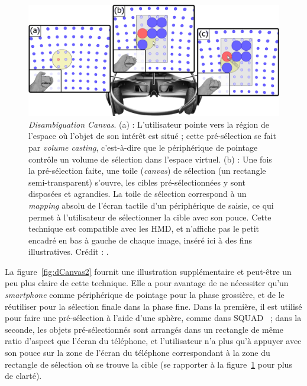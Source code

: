 	\begin{figure}[H]
		\centering
		\includegraphics[width=\textwidth]{figures/ch2/dCanvas}
		\caption[\emph{Disambiguation Canvas}]{\emph{Disambiguation Canvas}. (a) : L'utilisateur pointe vers la région de l'espace où l'objet de son intérêt est situé ; cette pré-sélection se fait par \emph{volume casting}, c'est-à-dire que le périphérique de pointage contrôle un volume de sélection dans l'espace virtuel. (b) : Une fois la pré-sélection faite, une \og toile \fg{} (\emph{canvas}) de sélection (un rectangle semi-transparent) s'ouvre, les cibles pré-sélectionnées y sont disposées et agrandies. La toile de sélection correspond à un \emph{mapping} absolu de l'écran tactile d'un périphérique de saisie, ce qui permet à l'utilisateur de sélectionner la cible avec son pouce. Cette technique est compatible avec les HMD, et n'affiche pas le petit encadré en bas à gauche de chaque image, inséré ici à des fins illustratives. Crédit : \cite{debarba2013disambiguation}.}
		\label{fig:dCanvas}
	\end{figure}
	
	La figure~\ref{fig:dCanvas2} fournit une illustration supplémentaire et peut-être un peu plus claire de cette technique. Elle a pour avantage de ne nécessiter qu'un \emph{smartphone} comme périphérique de pointage pour la phase grossière, et de le réutiliser pour la sélection finale dans la phase fine. Dans la première, il est utilisé pour faire une pré-sélection à l'aide d'une sphère, comme dans SQUAD~\cite{kopper2011rapid} ; dans la seconde, les objets pré-sélectionnés sont arrangés dans un rectangle de même ratio d'aspect que l'écran du téléphone, et l'utilisateur n'a plus qu'à appuyer avec son pouce sur la zone de l'écran du téléphone correspondant à la zone du rectangle de sélection où se trouve la cible (se rapporter à la figure~\ref{fig:dCanvas} pour plus de clarté).
	
